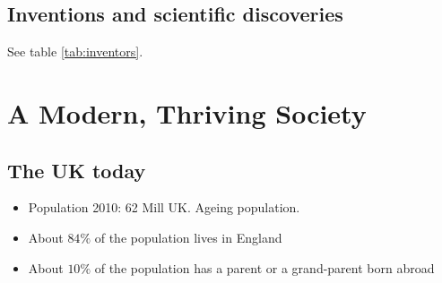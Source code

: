 \documentclass{amsart}
\begin{document}
\subsection{Inventions and scientific discoveries}

See table \ref{tab:inventors}.


\section{A Modern, Thriving Society}

\subsection{The UK today} 
	\begin{itemize}
		\item Population 2010: 62 Mill UK. Ageing population.
		\item About $84\%$ of the population lives in England
		\item About $10\%$ of the population has a parent or a  grand-parent born abroad 
	\end{itemize}
	
\end{document}
